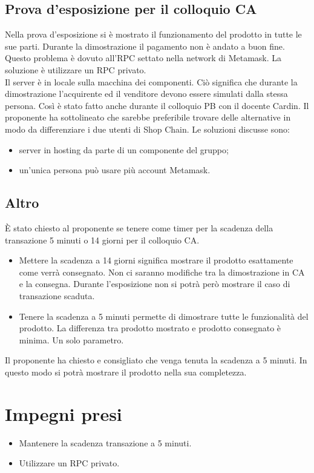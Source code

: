 \documentclass[a4paper, 12pt]{article}
\begin{document}
\subsection{Prova d'esposizione per il colloquio CA}
Nella prova d'esposizione si è mostrato il funzionamento del prodotto in tutte le sue parti. Durante la dimostrazione il pagamento non è andato a buon fine. Questo problema è dovuto all'RPC settato nella network di Metamask. La soluzione è utilizzare un RPC privato.
\\Il server è in locale sulla macchina dei componenti. Ciò significa che durante la dimostrazione l'acquirente ed il venditore devono essere simulati dalla stessa persona. Così è stato fatto anche durante il colloquio PB con il docente Cardin. Il proponente ha sottolineato che sarebbe preferibile trovare delle alternative in modo da differenziare i due utenti di Shop Chain. Le soluzioni discusse sono: 
\begin{itemize}
	\item server in hosting da parte di un componente del gruppo;
	\item un'unica persona può usare più account Metamask.
\end{itemize}

\subsection{Altro}
È stato chiesto al proponente se tenere come timer per la scadenza della transazione 5 minuti o 14 giorni per il colloquio CA.
\begin{itemize}
	\item Mettere la scadenza a 14 giorni significa mostrare il prodotto esattamente come verrà consegnato. Non ci saranno modifiche tra la dimostrazione in CA e la consegna. Durante l'esposizione non si potrà però mostrare il caso di transazione scaduta.
	\item Tenere la scadenza a 5 minuti permette di dimostrare tutte le funzionalità del prodotto. La differenza tra prodotto mostrato e prodotto consegnato è minima. Un solo parametro.
\end{itemize}
Il proponente ha chiesto e consigliato che venga tenuta la scadenza a 5 minuti. In questo modo si potrà mostrare il prodotto nella sua completezza.

\section{Impegni presi}
\begin{itemize}
\item Mantenere la scadenza transazione a 5 minuti.
\item Utilizzare un RPC privato.
\end{itemize}
\end{document}
